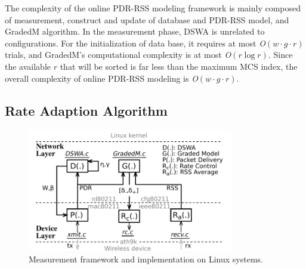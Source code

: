 \documentclass[journal,onecolumn,12pt]{IEEEtran}
\begin{document}
The complexity of the online PDR-RSS modeling framework is mainly composed of measurement, construct and update of database and PDR-RSS model, and GradedM algorithm. In the measurement phase, DSWA is unrelated to configurations. For the initialization of data base, it requires at most \textit{O}$(w\cdot g \cdot r)$ trials, and GradedM's computational complexity is at most \textit{O}$(r \log{r})$. Since the available $r$ that will be sorted is far less than the maximum MCS index, the overall complexity of online PDR-RSS modeling is \textit{O}$(w\cdot g \cdot r)$.


\subsection{Rate Adaption Algorithm}

\begin{figure}[!t]
\centering
\includegraphics[width=0.8\textwidth]{framework.pdf}
\caption{Measurement framework and implementation on Linux systems.}
\label{framework}
\end{figure}
\end{document}

